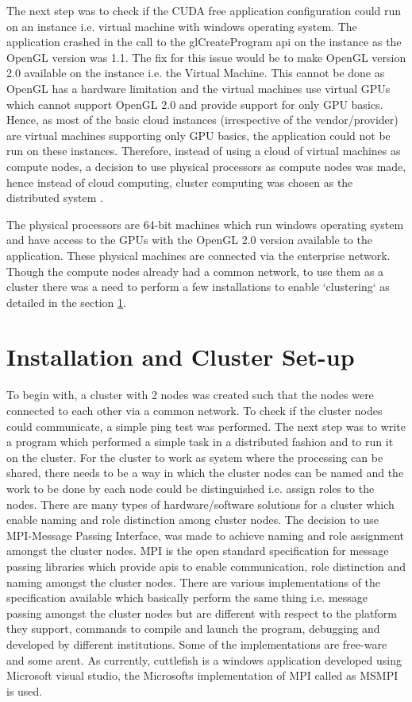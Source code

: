The next step was to check if the CUDA free application configuration could run on an instance i.e. virtual machine with windows operating system. The application crashed in the call to the glCreateProgram api on the instance as the OpenGL version was 1.1. The fix for this issue would be to make OpenGL version 2.0 available on the instance i.e. the Virtual Machine. This cannot be done as OpenGL has a hardware limitation and the virtual machines use virtual GPUs which cannot support OpenGL 2.0 and provide support for only GPU basics. Hence, as most of the basic cloud instances (irrespective of the vendor/provider) are virtual machines supporting only GPU basics, the application could not be run on these instances. Therefore, instead of using a cloud of virtual machines as compute nodes, a decision to use physical processors as compute nodes was made, hence instead of cloud computing, cluster computing was chosen as the distributed system . 

The physical processors are 64-bit machines which run windows operating system and have access to the GPUs with the OpenGL 2.0 version available to the application. These physical machines are connected via the enterprise network. Though the compute nodes already had a common network, to use them as a cluster there was a need to perform a few installations to enable `clustering` as detailed in the section \ref{ICS}. 


\section{Installation and Cluster Set-up} \label{ICS}

To begin with, a cluster with 2 nodes was created such that the nodes were connected to each other via a common network. To check if the cluster nodes could communicate, a simple ping test was performed. The next step was to write a program which performed a simple task in a distributed fashion and to run it on the cluster. For the cluster to work as system where the processing can be shared, there needs to be a way in which the cluster nodes can be named and the work to be done by each node could be distinguished i.e. assign roles to the nodes. There are many types of hardware/software solutions for a cluster which enable naming and role distinction among cluster nodes. The decision to use MPI-Message Passing Interface, was made to achieve naming and role assignment amongst the cluster nodes. MPI is the open standard specification for message passing libraries which provide apis to enable communication, role distinction and naming amongst the cluster nodes. There are various implementations of the specification available which basically perform the same thing i.e. message passing amongst the cluster nodes but are different with respect to the platform they support, commands to compile and launch the program, debugging and developed by different institutions. 
Some of the implementations are free-ware and some aren\textquotesingle t. As currently, cuttlefish is a windows application developed using Microsoft visual studio, the Microsoft\textquotesingle s implementation of MPI called as MSMPI is used. 

